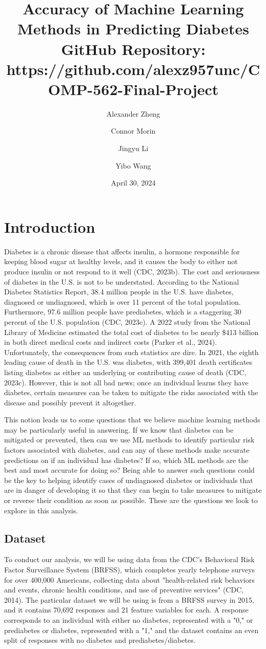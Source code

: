 \documentclass[12pt]{article}
\title{%
  Accuracy of Machine Learning Methods in Predicting Diabetes \\
  \vspace{5mm}
  \large GitHub Repository: https://github.com/alexz957unc/COMP-562-Final-Project}
\author{Alexander Zheng\and Connor Morin\and Jingyu Li\and Yibo Wang}
\date{April 30, 2024}
\begin{document}
\maketitle

\section{Introduction}
Diabetes is a chronic disease that affects insulin, a hormone responsible for keeping blood sugar at healthy levels, and it causes the body to either not produce insulin or not respond to it well (CDC, 2023b). The cost and seriousness of diabetes in the U.S. is not to be understated. According to the National Diabetes Statistics Report, 38.4 million people in the U.S. have diabetes, diagnosed or undiagnosed, which is over 11 percent of the total population. Furthermore, 97.6 million people have prediabetes, which is a staggering 30 percent of the U.S. population (CDC, 2023c). A 2022 study from the National Library of Medicine estimated the total cost of diabetes to be nearly \$413 billion in both direct medical costs and indirect costs (Parker et al., 2024). Unfortunately, the consequences from such statistics are dire. In 2021, the eighth leading cause of death in the U.S. was diabetes, with 399,401 death certificates listing diabetes as either an underlying or contributing cause of death (CDC, 2023c). However, this is not all bad news; once an individual learns they have diabetes, certain measures can be taken to mitigate the risks associated with the disease and possibly prevent it altogether.

This notion leads us to some questions that we believe machine learning methods may be particularly useful in answering. If we know that diabetes can be mitigated or prevented, then can we use ML methods to identify particular risk factors associated with diabetes, and can any of these methods make accurate predictions on if an individual has diabetes? If so, which ML methods are the best and most accurate for doing so? Being able to answer such questions could be the key to helping identify cases of undiagnosed diabetes or individuals that are in danger of developing it so that they can begin to take measures to mitigate or reverse their condition as soon as possible. These are the questions we look to explore in this analysis.

\subsection{Dataset}
To conduct our analysis, we will be using data from the CDC's Behavioral Risk Factor Surveillance System (BRFSS), which completes yearly telephone surveys for over 400,000 Americans, collecting data about "health-related risk behaviors and events, chronic health conditions, and use of preventive services" (CDC, 2014). The particular dataset we will be using is from a BRFSS survey in 2015, and it contains 70,692 responses and 21 feature variables for each. A response corresponds to an individual with either no diabetes, represented with a "0," or prediabetes or diabetes, represented with a "1," and the dataset contains an even split of responses with no diabetes and prediabetes/diabetes.
\end{document}

